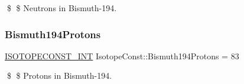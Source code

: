\$ \$ Neutrons in Bismuth-\/194. \mbox{\label{group___isotope_const-_bismuth-_bi194_ga48a977df82f607a59d0b798dfa7ec475}} 
\subsubsection{\texorpdfstring{Bismuth194\+Protons}{Bismuth194Protons}}
{\footnotesize\ttfamily \mbox{\hyperlink{group___isotope_const-_macros_ga5f18360b3e99483a35c32d789e62621c}{I\+S\+O\+T\+O\+P\+E\+C\+O\+N\+S\+T\+\_\+\+I\+NT}} Isotope\+Const\+::\+Bismuth194\+Protons = 83}

\$ \$ Protons in Bismuth-\/194. 